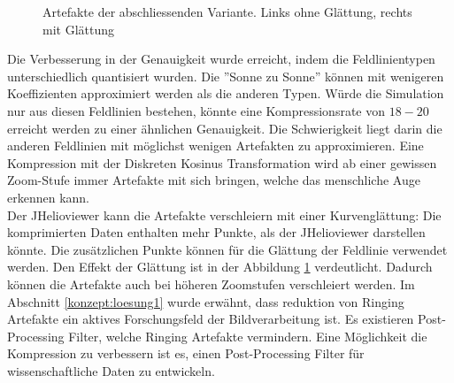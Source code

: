 \begin{figure}[!htbp]
	\center
	\caption{Artefakte der abschliessenden Variante. Links ohne Glättung, rechts mit Glättung}
	\label{resultate:loesung1:dct:final:artefakte}
\end{figure}
Die Verbesserung in der Genauigkeit wurde erreicht, indem die Feldlinientypen unterschiedlich quantisiert wurden. Die ''Sonne zu Sonne'' können mit wenigeren Koeffizienten approximiert werden als die anderen Typen. Würde die Simulation nur aus diesen Feldlinien bestehen, könnte eine Kompressionsrate von $18-20$ erreicht werden zu einer ähnlichen Genauigkeit. Die Schwierigkeit liegt darin die anderen Feldlinien mit möglichst wenigen Artefakten zu approximieren. Eine Kompression mit der Diskreten Kosinus Transformation wird ab einer gewissen Zoom-Stufe immer Artefakte mit sich bringen, welche das menschliche Auge erkennen kann.\\
Der JHelioviewer kann die Artefakte verschleiern mit einer Kurvenglättung: Die komprimierten Daten enthalten mehr Punkte, als der JHelioviewer darstellen könnte. Die zusätzlichen Punkte können für die Glättung der Feldlinie verwendet werden. Den Effekt der Glättung ist in der Abbildung \ref{resultate:loesung1:dct:final:artefakte} verdeutlicht. Dadurch können die Artefakte auch bei höheren Zoomstufen verschleiert werden. Im Abschnitt \ref{konzept:loesung1} wurde erwähnt, dass reduktion von Ringing Artefakte ein aktives Forschungsfeld der Bildverarbeitung ist. Es existieren Post-Processing Filter, welche Ringing Artefakte vermindern. Eine Möglichkeit die Kompression zu verbessern ist es, einen Post-Processing Filter für wissenschaftliche Daten zu entwickeln.
\pagebreak
